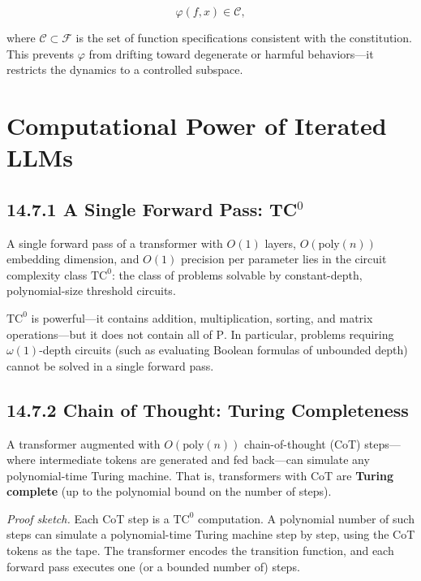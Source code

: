\[\varphi(f, x) \in \mathcal{C},\]

where $\mathcal{C} \subset \mathcal{F}$ is the set of function specifications consistent with the constitution. This prevents $\varphi$ from drifting toward degenerate or harmful behaviors---it restricts the dynamics to a controlled subspace.



\section{Computational Power of Iterated LLMs}

\subsection{14.7.1 A Single Forward Pass: TC$^0$}

\begin{theorem}
A single forward pass of a transformer with $O(1)$ layers, $O(\mathrm{poly}(n))$ embedding dimension, and $O(1)$ precision per parameter lies in the circuit complexity class $\mathrm{TC}^0$: the class of problems solvable by constant-depth, polynomial-size threshold circuits.

$\mathrm{TC}^0$ is powerful---it contains addition, multiplication, sorting, and matrix operations---but it does not contain all of $\mathrm{P}$. In particular, problems requiring $\omega(1)$-depth circuits (such as evaluating Boolean formulas of unbounded depth) cannot be solved in a single forward pass.
\end{theorem}

\subsection{14.7.2 Chain of Thought: Turing Completeness}

\begin{theorem}
A transformer augmented with $O(\mathrm{poly}(n))$ chain-of-thought (CoT) steps---where intermediate tokens are generated and fed back---can simulate any polynomial-time Turing machine. That is, transformers with CoT are \textbf{Turing complete} (up to the polynomial bound on the number of steps).

\textit{Proof sketch.} Each CoT step is a $\mathrm{TC}^0$ computation. A polynomial number of such steps can simulate a polynomial-time Turing machine step by step, using the CoT tokens as the tape. The transformer encodes the transition function, and each forward pass executes one (or a bounded number of) steps. 

\end{theorem}


